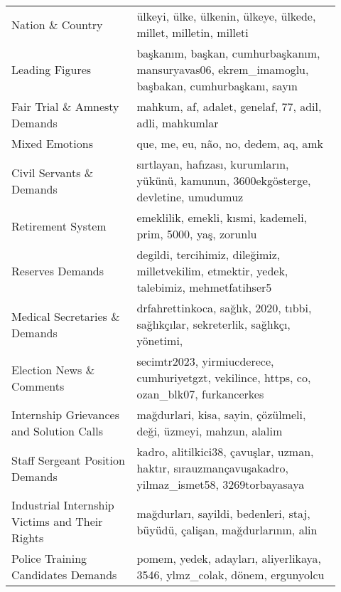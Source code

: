 \begin{table}
\begin{tabular}{|>{\hspace{0pt}}m{0.35\linewidth}|>{\hspace{0pt}}m{0.575\linewidth}|}
  Nation \& Country                             & ülkeyi, ülke, ülkenin, ülkeye, ülkede, millet, milletin, milleti                                                            \\
  Leading Figures                                & başkanım, başkan, cumhurbaşkanım, mansuryavas06, ekrem\_imamoglu, başbakan, cumhurbaşkanı, sayın                     \\
  Fair Trial \& Amnesty Demands        & mahkum, af, adalet, genelaf, 77, adil, adli, mahkumlar                                                                    \\
  Mixed Emotions                                 & que, me, eu, não, no, dedem, aq, amk                                                                                            \\
  Civil Servants \& Demands               & sırtlayan, hafızası, kurumların, yükünü, kamunun, 3600ekgösterge, devletine, umudumuz                                 \\
  Retirement System                              & emeklilik, emekli, kısmi, kademeli, prim, 5000, yaş, zorunlu                                                                    \\
  Reserves Demands               & degildi, tercihimiz, dileğimiz, milletvekilim, etmektir, yedek, talebimiz, mehmetfatihser5                             \\
  Medical Secretaries \& Demands          & drfahrettinkoca, sağlık, 2020, tıbbi, sağlıkçılar, sekreterlik, sağlıkçı, yönetimi,                         \\
  Election News \& Comments                     & secimtr2023, yirmiucderece, cumhuriyetgzt, vekilince, https, co, ozan\_blk07, furkancerkes                   \\
  Internship Grievances and Solution Calls       & mağdurlari, kisa, sayin, çözülmeli, deği, üzmeyi, mahzun, alalim                                                         \\
  Staff Sergeant Position Demands                & kadro, alitilkici38, çavuşlar, uzman, haktır, sırauzmançavuşakadro, yilmaz\_ismet58, 3269torbayasaya    \\
  Industrial Internship Victims and Their Rights & mağdurları, sayildi, bedenleri, staj, büyüdü, çalişan, mağdurlarının, alin                                             \\
  Police Training Candidates Demands            & pomem, yedek, adayları, aliyerlikaya, 3546, ylmz\_colak, dönem, ergunyolcu                                 \\

\end{tabular}
\end{table}
